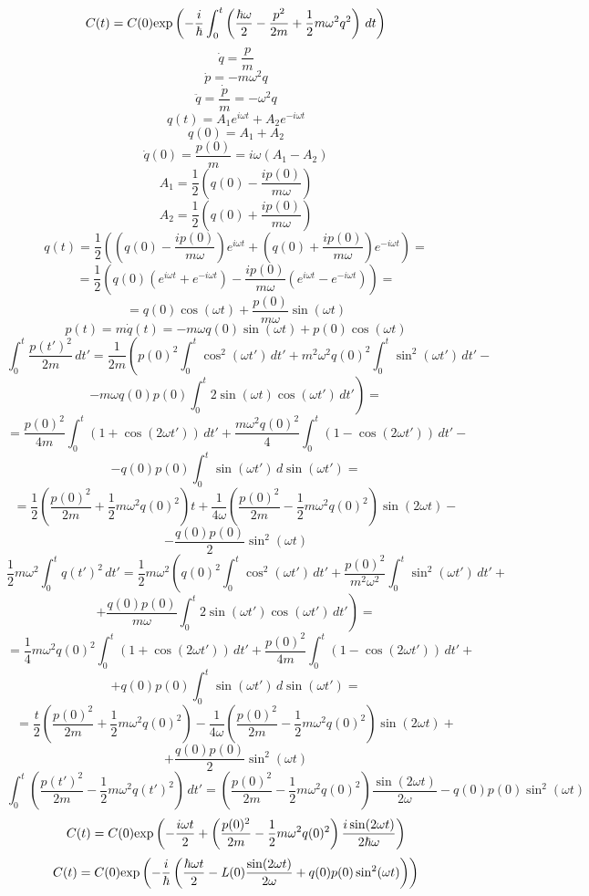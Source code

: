 $$C(t) = C(0)\text{exp}\left( -\frac{i}{\hbar}\int_0^t\left(\frac{\hbar\omega}{2}-\frac{p^2}{2m}+\frac{1}{2}m\omega^2q^2\right)\,dt \right)$$
$$\dot{q}=\frac{p}{m}$$
$$\dot{p}=-m\omega^2q$$
$$\ddot{q}=\frac{\dot{p}}{m}=-\omega^2q$$
$$q(t)=A_1 e^{i\omega t} + A_2 e^{-i\omega t} $$
$$q(0)=A_1 + A_2$$
$$\dot{q}(0)=\frac{p(0)}{m}=i\omega(A_1-A_2)$$
$$A_1 = \frac{1}{2}\left(q(0)-\frac{ip(0)}{m\omega}\right)$$
$$A_2 = \frac{1}{2}\left(q(0)+\frac{ip(0)}{m\omega}\right)$$
$$q(t) = \frac{1}{2}\left(\left(q(0)-\frac{ip(0)}{m\omega}\right)e^{i\omega t}+%
			  \left(q(0)+\frac{ip(0)}{m\omega}\right)e^{-i\omega t}\right)=$$
$$=\frac{1}{2}\left(q(0)\left(e^{i\omega t}+e^{-i\omega t}\right)-%
		    \frac{ip(0)}{m\omega}\left(e^{i\omega t}-e^{-i\omega t}\right)\right)=$$
$$=q(0)\cos(\omega t)+\frac{p(0)}{m\omega}\sin(\omega t)$$
$$p(t) = m\dot{q}(t) = -m\omega q(0)\sin(\omega t) + p(0) \cos(\omega t)$$
$$\int_0^t\frac{p(t')^2}{2m}\,dt'= \frac{1}{2m}\left(p(0)^2\int_0^t\cos^2(\omega t')\,dt'+%
						     m^2\omega^2q(0)^2\int_0^t\sin^2(\omega t')\,dt'-\right.$$
$$\left.-m\omega q(0)p(0)\int_0^t2\sin(\omega t)\cos(\omega t')\,dt'\right)=$$
$$=\frac{p(0)^2}{4m}\int_0^t(1+\cos(2\omega t'))\,dt'+\frac{m\omega^2q(0)^2}{4}\int_0^t(1-\cos(2\omega t'))\,dt'-$$
$$-q(0)p(0)\int_0^t\sin(\omega t')\,d\sin( \omega t' )=$$
$$=\frac{1}{2}\left(\frac{p(0)^2}{2m}+\frac{1}{2}m\omega^2q(0)^2\right)t+%
   \frac{1}{4\omega}\left(\frac{p(0)^2}{2m}-\frac{1}{2}m\omega^2q(0)^2\right)\sin(2\omega t)-$$
$$-\frac{q(0)p(0)}{2}\sin^2(\omega t)$$
$$\frac{1}{2}m\omega^2\int_0^tq(t')^2\,dt'=\frac{1}{2}m\omega^2\left(q(0)^2\int_0^t\cos^2(\omega t')\,dt'+%
							             \frac{p(0)^2}{m^2\omega^2}\int_0^t\sin^2(\omega t')\,dt'+\right.$$
$$\left.+\frac{q(0)p(0)}{m\omega}\int_0^t2\sin(\omega t')\cos(\omega t')\,dt'\right)=$$
$$=\frac{1}{4}m\omega^2q(0)^2\int_0^t(1+\cos(2\omega t'))\,dt'+\frac{p(0)^2}{4m}\int_0^t(1-\cos(2\omega t'))\,dt'+$$
$$+q(0)p(0)\int_0^t\sin(\omega t')\,d\sin(\omega t')=$$
$$=\frac{t}{2}\left(\frac{p(0)^2}{2m}+\frac{1}{2}m\omega^2q(0)^2\right)-%
   \frac{1}{4\omega}\left(\frac{p(0)^2}{2m}-\frac{1}{2}m\omega^2q(0)^2\right)\sin(2\omega t)+$$
$$+\frac{q(0)p(0)}{2}\sin^2(\omega t)$$
$$\int_0^t\left(\frac{p(t')^2}{2m}-\frac{1}{2}m\omega^2q(t')^2\right)\,dt'=%
  \left(\frac{p(0)^2}{2m}-\frac{1}{2}m\omega^2q(0)^2\right)\frac{\sin(2\omega t)}{2\omega}-q(0)p(0)\sin^2(\omega t)$$
$$C(t) = C(0) \text{exp}\left( -\frac{i\omega t}{2}+\left(\frac{p(0)^2}{2m}-\frac{1}{2}m\omega^2q(0)^2\right)\frac{i\sin(2\omega t)}{2\hbar\omega} \right)$$
\begin{equation}
C(t)=C(0)\text{exp}\left( -\frac{i}{\hbar}\left(\frac{\hbar\omega t}{2}-\mathit{L}(0)\frac{\sin(2\omega t)}{2\omega}+q(0)p(0)\sin^2(\omega t)\right) \right)
\label{eq:coeff}
\end{equation}
